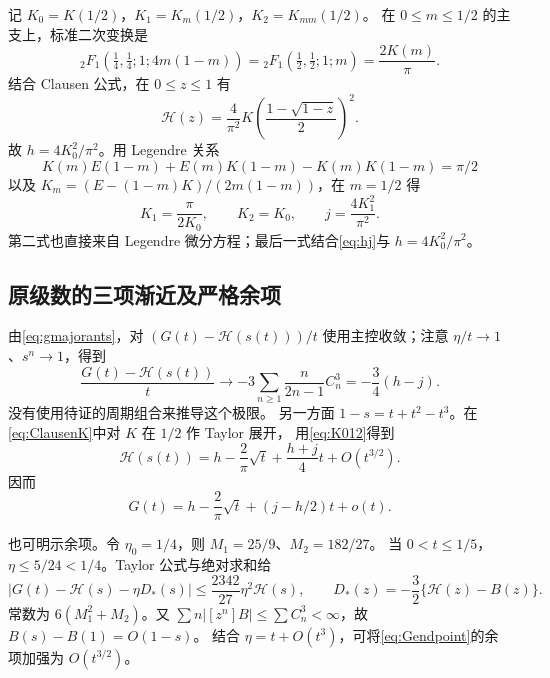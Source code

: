 \documentclass[11pt,a4paper]{article}
\numberwithin{equation}{section}
\theoremstyle{remark}\newtheorem{remark}[theorem]{说明}
\newcommand{\HH}{\mathscr H}
\begin{document}
记 $K_0=K(1/2)$，$K_1=K_m(1/2)$，$K_2=K_{mm}(1/2)$。
在 $0\le m\le1/2$ 的主支上，标准二次变换是
\[
 {}_2F_1(\tfrac14,\tfrac14;1;4m(1-m))
 ={}_2F_1(\tfrac12,\tfrac12;1;m)=\frac{2K(m)}\pi.
\]
结合 Clausen 公式，在 $0\le z\le1$ 有
\begin{equation}\label{eq:ClausenK}
 \HH(z)=\frac4{\pi^2}K\left(\frac{1-\sqrt{1-z}}2\right)^2.
\end{equation}
故 $h=4K_0^2/\pi^2$。用 Legendre 关系
\begin{equation}\label{eq:Legendre}
 K(m)E(1-m)+E(m)K(1-m)-K(m)K(1-m)=\pi/2
\end{equation}
以及 $K_m=(E-(1-m)K)/(2m(1-m))$，在 $m=1/2$ 得
\begin{equation}\label{eq:K012}
 K_1=\frac{\pi}{2K_0},\qquad K_2=K_0,\qquad j=\frac{4K_1^2}{\pi^2}.
\end{equation}
第二式也直接来自 Legendre 微分方程；最后一式结合\eqref{eq:hj}与 $h=4K_0^2/\pi^2$。

\subsection{原级数的三项渐近及严格余项}
由\eqref{eq:gmajorants}，对
$(G(t)-\HH(s(t)))/t$ 使用主控收敛；注意 $\eta/t\to1$、$s^n\to1$，得到
\begin{equation}\label{eq:limitG}
 \frac{G(t)-\HH(s(t))}{t}\longrightarrow
 -3\sum_{n\ge1}\frac{n}{2n-1}C_n^3=-\frac34(h-j).
\end{equation}
没有使用待证的周期组合来推导这个极限。
另一方面 $1-s=t+t^2-t^3$。在\eqref{eq:ClausenK}中对 $K$ 在 $1/2$ 作 Taylor 展开，
用\eqref{eq:K012}得到
\[
 \HH(s(t))=h-\frac2\pi\sqrt t+\frac{h+j}{4}t+O(t^{3/2}).
\]
因而
\begin{equation}\label{eq:Gendpoint}
 G(t)=h-\frac2\pi\sqrt t+(j-h/2)t+o(t).
\end{equation}

也可明示余项。令 $\eta_0=1/4$，则 $M_1=25/9$、$M_2=182/27$。
当 $0<t\le1/5$，$\eta\le5/24<1/4$。Taylor 公式与绝对求和给
\begin{equation}\label{eq:uniformerror}
 \left|G(t)-\HH(s)-\eta D_*(s)\right|
 \le\frac{2342}{27}\eta^2\HH(s),\qquad
 D_*(z)=-\frac32\{\HH(z)-B(z)\}.
\end{equation}
常数为 $6(M_1^2+M_2)$。又
$\sum n|[z^n]B|\le\sum C_n^3<\infty$，故 $B(s)-B(1)=O(1-s)$。
结合 $\eta=t+O(t^3)$，可将\eqref{eq:Gendpoint}的余项加强为 $O(t^{3/2})$。
\end{document}
